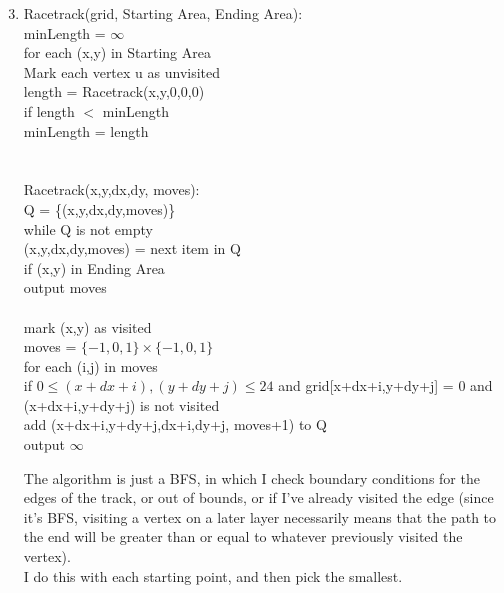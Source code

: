 
\usepackage{amsmath, verbatim, tikz, float}

\usetikzlibrary{arrows,automata}

\oddsidemargin 0in
\evensidemargin 0in
\textwidth 6.5in
\topmargin -0.5in
\textheight 9.0in
\newcommand{\norm}[1]{\left\lVert #1 \right\rVert}


\pagestyle{myheadings}

\begin{enumerate}
  \setcounter{enumi}{2} 
\item
  \begin{algorithm}
    Racetrack(grid, Starting Area, Ending Area):\\
    \>minLength = $\infty$\\
    \>for each (x,y) in Starting Area\\
    \>\>Mark each vertex u as unvisited\\
    \>\>length = Racetrack(x,y,0,0,0)\\
    \>\>if length $<$ minLength\\
    \>\>\>minLength = length\\\\\\

    Racetrack(x,y,dx,dy, moves):\\
    \>Q = \{(x,y,dx,dy,moves)\}\\
    \>while Q is not empty\\
    \>\>(x,y,dx,dy,moves) = next item in Q\\
    \>\>if (x,y) in Ending Area\\
    \>\>\>output moves\\\\
    \>\>mark (x,y) as visited\\
    \>\>moves = $\{-1, 0, 1\} \times \{-1, 0, 1\}$\\
    \>\>for each (i,j) in moves\\
    \>\>\>if $0 \leq (x+dx+i),(y+dy+j) \leq 24$ and grid[x+dx+i,y+dy+j] = 0 and (x+dx+i,y+dy+j) is not visited\\
    \>\>\>\>add (x+dx+i,y+dy+j,dx+i,dy+j, moves+1) to Q\\
    \>output $\infty$
  \end{algorithm}
  The algorithm is just a BFS, in which I check boundary conditions for the edges of the track, or out of bounds, or if I've already visited the edge (since it's BFS, visiting a vertex on a later layer necessarily means that the path to the end will be greater than or equal to whatever previously visited the vertex).\\
  I do this with each starting point, and then pick the smallest.\\
\end{enumerate}
